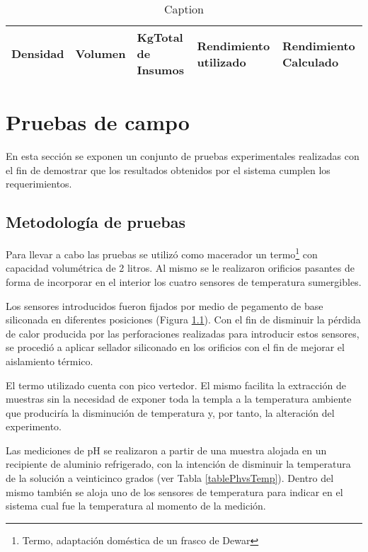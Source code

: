 \begin{table}[h]
    \centering
    \begin{tabularx}{\textwidth}{|X|X|X|X|X|}
        Densidad & Volumen & KgTotal de Insumos & Rendimiento utilizado & Rendimiento Calculado \\
        \hline
        \hline
        
    \end{tabularx}
    \caption{Caption}
    \label{tab:my_label}
\end{table}


\section{Pruebas de campo}
\par En esta sección se exponen un conjunto de pruebas experimentales realizadas con el fin de demostrar que los resultados obtenidos por el sistema cumplen los requerimientos. 

    \subsection{Metodología de pruebas}
        \par Para llevar a cabo las pruebas se utilizó como macerador un termo\footnote{Termo, adaptación doméstica de un frasco de Dewar} con capacidad volumétrica de 2 litros. Al mismo se le realizaron orificios pasantes de forma de incorporar en el interior los cuatro sensores de temperatura sumergibles.
        
        \par Los sensores introducidos fueron fijados por medio de pegamento de base siliconada en diferentes posiciones (Figura \ref{}). Con el fin de disminuir la pérdida de calor producida por las perforaciones realizadas para introducir estos sensores, se procedió a aplicar sellador siliconado  en los orificios con el fin de mejorar el aislamiento térmico.
        
        \par El termo utilizado cuenta con pico vertedor. El mismo facilita la extracción de muestras sin la necesidad de exponer toda la templa a la temperatura ambiente que produciría la disminución de temperatura y, por tanto, la alteración del experimento.
        
        \par Las mediciones de pH se realizaron a partir de una muestra alojada en un recipiente de aluminio refrigerado, con la intención de disminuir la temperatura de la solución a veinticinco grados (ver Tabla \ref{tablePhvsTemp}). Dentro del mismo también se aloja uno de los sensores de temperatura para indicar en el sistema cual fue la temperatura al momento de la medición. 
        
